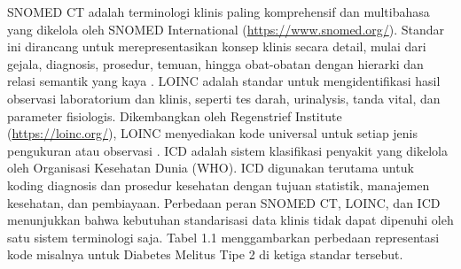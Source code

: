 SNOMED CT adalah terminologi klinis paling komprehensif dan multibahasa yang dikelola oleh SNOMED International (\url{https://www.snomed.org/}). Standar ini dirancang untuk merepresentasikan konsep klinis secara detail, mulai dari gejala, diagnosis, prosedur, temuan, hingga obat-obatan dengan hierarki dan relasi semantik yang kaya \citep{ayuningtyas_bringing_2025}. LOINC adalah standar untuk mengidentifikasi hasil observasi laboratorium dan klinis, seperti tes darah, urinalysis, tanda vital, dan parameter fisiologis. Dikembangkan oleh Regenstrief Institute (\url{https://loinc.org/}), LOINC menyediakan kode universal untuk setiap jenis pengukuran atau observasi \citep{ayuningtyas_bringing_2025}. ICD adalah sistem klasifikasi penyakit yang dikelola oleh Organisasi Kesehatan Dunia (WHO). ICD digunakan terutama untuk koding diagnosis dan prosedur kesehatan dengan tujuan statistik, manajemen kesehatan, dan pembiayaan. Perbedaan peran SNOMED CT, LOINC, dan ICD menunjukkan bahwa kebutuhan standarisasi data klinis tidak dapat dipenuhi oleh satu sistem terminologi saja. Tabel 1.1 menggambarkan perbedaan representasi kode misalnya untuk Diabetes Melitus Tipe 2 di ketiga standar tersebut.

